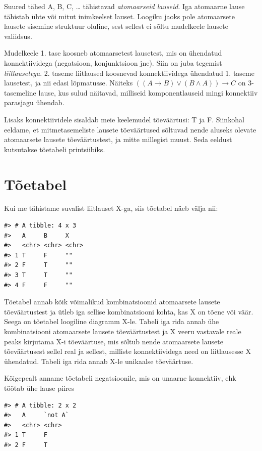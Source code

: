 \documentclass[]{book}
\begin{document}
Suured tähed A, B, C, \ldots{} tähistavad \emph{atomaarseid lauseid}. Iga atomaarne lause tähistab ühte või mitut inimkeelset lauset. Loogiku jaoks pole atomaarsete lausete sisemine struktuur oluline, sest sellest ei sõltu mudelkeele lausete valiidsus.

Mudelkeele 1. tase koosneb atomaarsetest lausetest, mis on ühendatud konnektiividega (negatsioon, konjunktsioon jne). Siin on juba tegemist \emph{liitlausetega}. 2. taseme liitlaused koosnevad konnektiividega ühendatud 1. taseme lausetest, ja nii edasi lõpmatusse. Näiteks \(((A \rightarrow B) \lor (B \land A)) \rightarrow C\) on 3-tasemeline lause, kus sulud näitavad, milliseid komponentlauseid mingi konnektiiv parasjagu ühendab.

Lisaks konnektiividele sisaldab meie keelemudel tõeväärtusi: T ja F. Siinkohal eeldame, et mitmetasemeliste lausete tõeväärtused sõltuvad nende aluseks olevate atomaarsete lausete tõeväärtustest, ja mitte millegist muust. Seda eeldust kutsutakse tõetabeli printsiibiks.

\hypertarget{toetabel}{%
\section{Tõetabel}\label{toetabel}}

Kui me tähistame suvalist liitlauset X-ga, siis tõetabel näeb välja nii:

\begin{verbatim}
#> # A tibble: 4 x 3
#>   A     B     X    
#>   <chr> <chr> <chr>
#> 1 T     F     ""   
#> 2 F     T     ""   
#> 3 T     T     ""   
#> 4 F     F     ""
\end{verbatim}

Tõetabel annab kõik võimalikud kombinatsioonid atomaarsete lausete tõeväärtustest ja ütleb iga sellise kombinatsiooni kohta, kas X on tõene või väär. Seega on tõetabel loogiline diagramm X-le. Tabeli iga rida annab ühe kombinatsiooni atomaarsete lausete tõeväärtustest ja X veeru vastavale reale peaks kirjutama X-i tõeväärtuse, mis sõltub nende atomaarsete lausete tõeväärtusest sellel real ja sellest, milliste konnektiividega need on liitlausesse X ühendatud. Tabeli iga rida annab X-le unikaalse tõeväärtuse.

Kõigepealt anname tõetabeli negatsioonile, mis on unaarne konnektiiv, ehk töötab ühe lause piires

\begin{verbatim}
#> # A tibble: 2 x 2
#>   A     `not A`
#>   <chr> <chr>  
#> 1 T     F      
#> 2 F     T
\end{verbatim}
\end{document}
